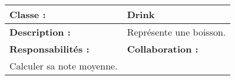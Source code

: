 \begin{center}
\begin{tabular}{|p{6cm}p{6cm}|}
	\hline
		\textbf{Classe :} & Drink \\
	\hline
		\textbf{Description :} & Représente une boisson. \\
	\hline
		\textbf{Responsabilités :} & \textbf{Collaboration :} \\
		Calculer sa note moyenne. & \\
	\hline		
\end{tabular}

\vspace{0.5cm}

\end{center}

